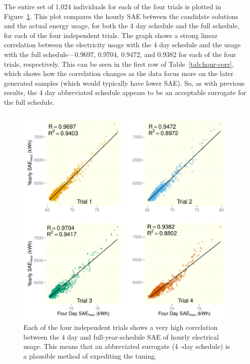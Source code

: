 \documentclass[preprint, review, 12pt]{elsarticle}
\begin{document}
The entire set of 1,024 individuals for each of the four trials is plotted in Figure~\ref{fig:hour-corr}. This plot compares the hourly SAE between the candidate solutions and the actual energy usage, for both the 4 day schedule and the full schedule, for each of the four independent trials. The graph shows a strong linear correlation between the electricity usage with the 4 day schedule and the usage with the full schedule---0.9697, 0.9704, 0.9472, and 0.9382 for each of the four trials, respectively. This can be seen in the first row of Table~\ref{tab:hour-corr}, which shows how the correlation changes as the data focus more on the later generated samples (which would typically have lower SAE). So, as with previous results, the 4 day abbreviated schedule appears to be an acceptable surrogate for the full schedule. 

\begin{figure}[htbp]
\centering
\includegraphics[width=5in]{graphics/figure1.pdf}
\caption{Each of the four independent trials shows a very high correlation between the 4 day and full-year-schedule SAE of hourly electrical usage. This means that an abbreviated surrogate (4 -day schedule) is a plausible method of expediting the tuning.}
\label{fig:hour-corr}
\end{figure}
\end{document}
